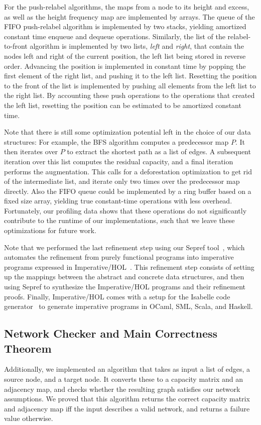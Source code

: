 \documentclass[smallcondensed]{svjour3}     %
\begin{document}
  For the push-relabel algorithms, the maps from a node to its height and excess, as well as the height frequency map are implemented by arrays. 
  The queue of the FIFO push-relabel algorithm is implemented by two stacks, yielding amortized constant time enqueue and dequeue operations.
  Similarly, the list of the relabel-to-front algorithm is implemented by two lists, \emph{left} and \emph{right}, that contain the nodes left and right of the current position,
  the left list being stored in reverse order. Advancing the position is implemented in constant time by popping the first element of the right list, and pushing 
  it to the left list. Resetting the position to the front of the list is implemented by pushing all elements from the left list to the right list. 
  By accounting these push operations to the operations that created the left list, resetting the position can be estimated to be amortized constant time.
  
  

  Note that there is still some optimization potential left in the choice of our data structures: 
  For example, the BFS algorithm computes a predecessor map $P$. It then iterates over $P$ to extract the shortest path as a list of edges.
  A subsequent iteration over this list computes the residual capacity, and a final iteration performs the augmentation. 
  This calls for a deforestation optimization to get rid of the intermediate list, and iterate only two times over the predecessor map directly.
  Also the FIFO queue could be implemented by a ring buffer based on a fixed size array, yielding true constant-time operations with less overhead.
  Fortunately, our profiling data shows that these operations do not significantly contribute to the runtime of our implementations, such that 
  we leave these optimizations for future work.
  
  Note that we performed the last refinement step using our Sepref tool~\cite{La15,La16}, which automates the refinement from 
  purely functional programs into imperative programs expressed in Imperative/HOL~\cite{BKHEM08}.
  This refinement step consists of setting up the mappings between the abstract and concrete data structures,
  and then using Sepref to synthesize the Imperative/HOL programs and their refinement proofs.
  Finally, Imperative/HOL comes with a setup for the Isabelle code generator~\cite{Haft09,HaNi10} to generate imperative programs in OCaml, SML, Scala, and Haskell.

  \subsection{Network Checker and Main Correctness Theorem}
  Additionally, we implemented an algorithm that takes as input a list of edges, a source node, and a target node.
  It converts these to a capacity matrix and an adjacency map, and checks whether the resulting graph satisfies our network assumptions.
  We proved that this algorithm returns the correct capacity matrix and adjacency map iff the input describes a valid network,
  and returns a failure value otherwise.
    
\end{document}
